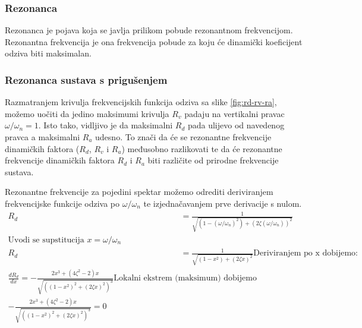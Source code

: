 \subsubsection{Rezonanca}
Rezonanca je pojava koja se javlja prilikom pobude rezonantnom frekvencijom.
Rezonantna frekvencija je ona frekvencija pobude za koju će dinamički koeficijent
odziva biti maksimalan. 
\par

\subsubsection{Rezonanca sustava s prigušenjem}
Razmatranjem krivulja frekvencijskih funkcija odziva sa slike 
\ref{fig:rd-rv-ra}, možemo uočiti da jedino maksimumi krivulja $R_v$ padaju na 
vertikalni pravac $\omega/\omega_n=1$. Isto tako, vidljivo je da maksimalni $R_d$
pada ulijevo od navedenog pravca a maksimalni $R_a$ udesno. To znači da će se 
rezonantne frekvencije dinamičkih faktora ($R_d$, $R_v$ i $R_a$) međusobno razlikovati 
te da će rezonantne frekvencije dinamičkih faktora $R_d$ i $R_a$ biti različite od
prirodne frekvencije sustava.

Rezonantne frekvencije za pojedini spektar možemo odrediti deriviranjem frekvencijske 
funkcije odziva po $\omega/\omega_n$ te izjednačavanjem prve derivacije s nulom.
\[
    \begin{aligned}
        R_d &= \frac{1}{\sqrt{(1-(\omega/\omega_n)^2) + (2\zeta(\omega/\omega_n))^2}}\\
        \text{Uvodi se supstitucija } x=\omega/\omega_n\\
        R_d &= \frac{1}{\sqrt{(1-x^2)+(2\zeta x)^2}}
        \text{Deriviranjem po x dobijemo:}\\
        \frac{dR_d}{dx}=-\frac{2x^3+(4\zeta^2-2)x}{\sqrt{((1-x^2)^2+(2\zeta x)^2)^3}}
        \text{Lokalni ekstrem (maksimum) dobijemo izjednačavanjem prve derivacije s
        nulom, odnosno:}\\
        -\frac{2x^3+(4\zeta^2-2)x}{\sqrt{((1-x^2)^2+(2\zeta x)^2)^3}} = 0
    \end{aligned}
\]

